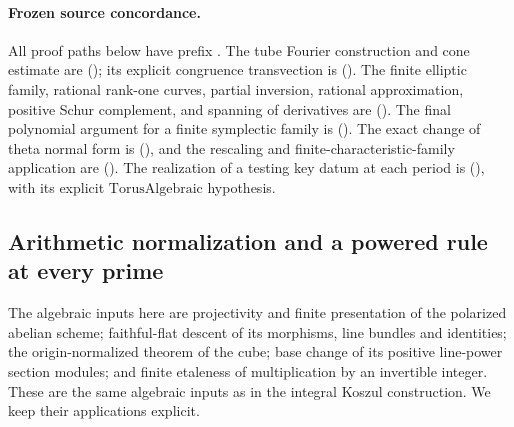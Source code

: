 \paragraph{Frozen source concordance.}
All proof paths below have prefix
.
The tube Fourier construction and cone estimate are
();
its explicit congruence transvection is
().
The finite elliptic family, rational rank-one curves, partial
inversion, rational approximation, positive Schur complement,
and spanning of derivatives are
().
The final polynomial argument for a finite symplectic family is
().
The exact change of theta normal form is
(),
and the rescaling and finite-characteristic-family application
are 
().
The realization of a testing key datum at each period is
(),
with its explicit \(\mathrm{TorusAlgebraic}\) hypothesis.


\subsection{Arithmetic normalization and a powered rule at every prime}
\label{sec:ftb-powered-key-all-primes}

The algebraic inputs here are projectivity and finite presentation of
the polarized abelian scheme; faithful-flat descent of its morphisms,
line bundles and identities; the origin-normalized theorem of the cube;
base change of its positive line-power section modules; and finite
etaleness of multiplication by an invertible integer.  These are the
same algebraic inputs as in the integral Koszul construction.  We keep
their applications explicit.


